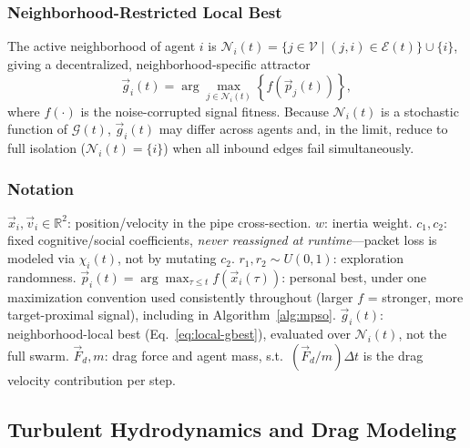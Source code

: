 \documentclass[conference]{IEEEtran}
\begin{document}
\subsubsection{Neighborhood-Restricted Local Best}
\label{sec:local-best}

The active neighborhood of agent $i$ is $\mathcal{N}_i(t) = \{j \in \mathcal{V} \mid (j,i)\in\mathcal{E}(t)\}\cup\{i\}$, giving a decentralized, neighborhood-specific attractor
\begin{equation}
\vec{g}_i(t) = \arg\max_{j \in \mathcal{N}_i(t)} \left\{ f\left(\vec{p}_j(t)\right) \right\},
\label{eq:local-gbest}
\end{equation}
where $f(\cdot)$ is the noise-corrupted signal fitness. Because $\mathcal{N}_i(t)$ is a stochastic function of $\mathcal{G}(t)$, $\vec{g}_i(t)$ may differ across agents and, in the limit, reduce to full isolation ($\mathcal{N}_i(t)=\{i\}$) when all inbound edges fail simultaneously.

\subsubsection{Notation}
\label{sec:param-defs}

$\vec{x}_i,\vec{v}_i \in \mathbb{R}^2$: position/velocity in the pipe cross-section. $w$: inertia weight. $c_1,c_2$: fixed cognitive/social coefficients, \emph{never reassigned at runtime}---packet loss is modeled via $\chi_i(t)$, not by mutating $c_2$. $r_1,r_2\sim U(0,1)$: exploration randomness. $\vec{p}_i(t) = \arg\max_{\tau\le t} f(\vec{x}_i(\tau))$: personal best, under one maximization convention used consistently throughout (larger $f$ = stronger, more target-proximal signal), including in Algorithm~\ref{alg:mpso}. $\vec{g}_i(t)$: neighborhood-local best (Eq.~\ref{eq:local-gbest}), evaluated over $\mathcal{N}_i(t)$, not the full swarm. $\vec{F}_d, m$: drag force and agent mass, s.t.\ $(\vec{F}_d/m)\Delta t$ is the drag velocity contribution per step.

\subsection{Turbulent Hydrodynamics and Drag Modeling}
\label{sec:hydro}
\end{document}
